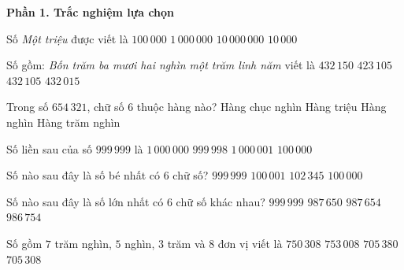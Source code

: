 \textbf{Phần 1. Trắc nghiệm lựa chọn}

\begin{ex} %
Số \textit{Một triệu} được viết là
\choice
{$100\,000$}
{\True $1\,000\,000$}
{$10\,000\,000$}
{$10\,000$}
\end{ex}

\begin{ex} %
Số gồm: \textit{Bốn trăm ba mươi hai nghìn một trăm linh năm} viết là
\choice
{$432\,150$}
{$423\,105$}
{\True $432\,105$}
{$432\,015$}
\end{ex}

\begin{ex} %
Trong số $654\,321$, chữ số $6$ thuộc hàng nào?
\choice
{Hàng chục nghìn}
{Hàng triệu}
{Hàng nghìn}
{\True Hàng trăm nghìn}
\end{ex}

\begin{ex} %
Số liền sau của số $999\,999$ là
\choice
{\True $1\,000\,000$}
{$999\,998$}
{$1\,000\,001$}
{$100\,000$}
\end{ex}

\begin{ex} %
Số nào sau đây là số bé nhất có 6 chữ số?
\choice
{$999\,999$}
{$100\,001$}
{$102\,345$}
{\True $100\,000$}
\end{ex}

\begin{ex} %
Số nào sau đây là số lớn nhất có 6 chữ số khác nhau?
\choice
{$999\,999$}
{$987\,650$}
{\True $987\,654$}
{$986\,754$}
\end{ex}

\begin{ex} %
Số gồm $7$ trăm nghìn, $5$ nghìn, $3$ trăm và $8$ đơn vị viết là
\choice
{$750\,308$}
{$753\,008$}
{$705\,380$}
{\True $705\,308$}
\end{ex}


